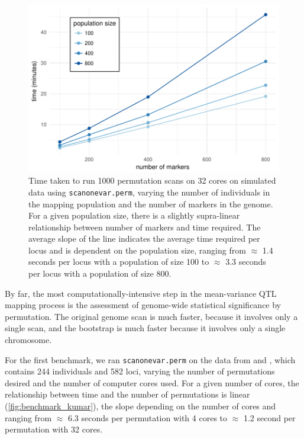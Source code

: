 \documentclass[9pt,twocolumn,twoside]{gsag3jnl}
\begin{document}
\begin{figure}[t]
    \includegraphics[width = \linewidth]{images/benchmark_sim_cross.pdf}
    \caption{
        Time taken to run 1000 permutation scans on 32 cores on simulated data using \texttt{scanonevar.perm}, varying the number of individuals in the mapping population and the number of markers in the genome.
        For a given population size, there is a slightly supra-linear relationship between number of markers and time required.
        The average slope of the line indicates the average time required per locus and is dependent on the population size, ranging from $\approx$ 1.4 seconds per locus with a population of size 100 to $\approx$ 3.3 seconds per locus with a population of size 800.
    }
    \label{fig:benchmark_sim_cross}
\end{figure}

By far, the most computationally-intensive step in the mean-variance QTL mapping process is the assessment of genome-wide statistical significance by permutation.
The original genome scan is much faster, because it involves only a single scan, and the bootstrap is much faster because it involves only a single chromosome.

For the first benchmark, we ran \texttt{scanonevar.perm} on the data from \citet{Kumar2013} and \citet{Corty2018biorxiv}, which contains 244 individuals and 582 loci, varying the number of permutations desired and the number of computer cores used.
For a given number of cores, the relationship between time and the number of permutations is linear (\autoref{fig:benchmark_kumar}), the slope depending on the number of cores and ranging from $\approx$ 6.3 seconds per permutation with 4 cores to $\approx$ 1.2 second per permutation with 32 cores.
\end{document}
